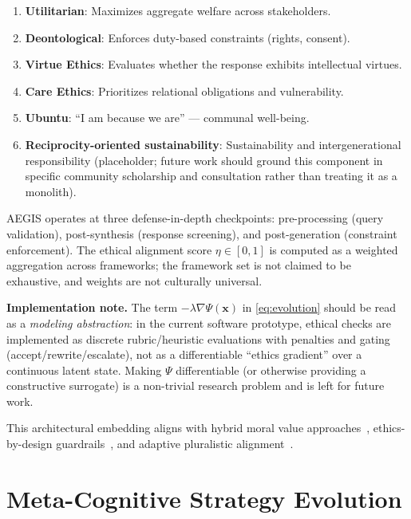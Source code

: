 \documentclass[11pt,a4paper]{article}
\begin{document}
\begin{enumerate}[nosep]
  \item \textbf{Utilitarian}: Maximizes aggregate welfare across stakeholders.
  \item \textbf{Deontological}: Enforces duty-based constraints (rights, consent).
  \item \textbf{Virtue Ethics}: Evaluates whether the response exhibits intellectual virtues.
  \item \textbf{Care Ethics}: Prioritizes relational obligations and vulnerability.
  \item \textbf{Ubuntu}: ``I am because we are'' --- communal well-being.
  \item \textbf{Reciprocity-oriented sustainability}: Sustainability and intergenerational responsibility (placeholder; future work should ground this component in specific community scholarship and consultation rather than treating it as a monolith).
\end{enumerate}

AEGIS operates at three defense-in-depth checkpoints: pre-processing (query validation), post-synthesis (response screening), and post-generation (constraint enforcement). The ethical alignment score $\eta \in [0,1]$ is computed as a weighted aggregation across frameworks; the framework set is not claimed to be exhaustive, and weights are not culturally universal.

\textbf{Implementation note.} The term $-\lambda\nabla\Psi(\mathbf{x})$ in \cref{eq:evolution} should be read as a \emph{modeling abstraction}: in the current software prototype, ethical checks are implemented as discrete rubric/heuristic evaluations with penalties and gating (accept/rewrite/escalate), not as a differentiable ``ethics gradient'' over a continuous latent state. Making $\Psi$ differentiable (or otherwise providing a constructive surrogate) is a non-trivial research problem and is left for future work.

This architectural embedding aligns with hybrid moral value approaches~\citep{tennant2023hybrid}, ethics-by-design guardrails~\citep{sekrst2024ethics}, and adaptive pluralistic alignment~\citep{harland2024adaptive}.

\section{Meta-Cognitive Strategy Evolution}
\label{sec:metacognition}
\end{document}
